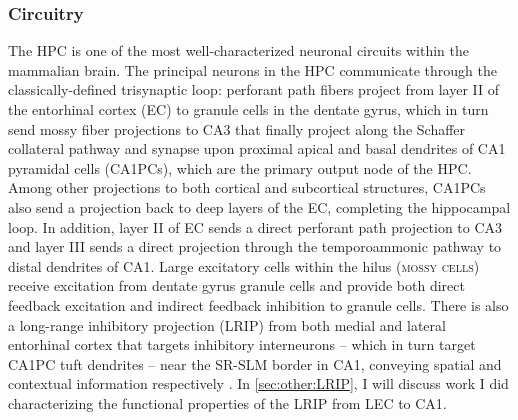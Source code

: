 \subsubsection{Circuitry}
The \ac{HPC} is one of the most well-characterized neuronal circuits within the mammalian brain.
The principal neurons in the \ac{HPC} communicate through the classically-defined trisynaptic loop: perforant path fibers project from layer II of the entorhinal cortex (EC) to granule cells in the dentate gyrus, which in turn send mossy fiber projections to CA3 that finally project along the Schaffer collateral pathway and synapse upon proximal apical and basal dendrites of CA1 pyramidal cells (CA1PCs), which are the primary output node of the \ac{HPC}.
Among other projections to both cortical and subcortical structures, CA1PCs also send a projection back to deep layers of the EC, completing the hippocampal loop.
In addition, layer II of EC sends a direct perforant path projection to CA3 and layer III sends a direct projection through the temporoammonic pathway to distal dendrites of CA1.
Large excitatory cells within the hilus (\textsc{mossy cells}) receive excitation from dentate gyrus granule cells and provide both direct feedback excitation and indirect feedback inhibition to granule cells.
There is also a long-range inhibitory projection (LRIP) from both medial and lateral entorhinal cortex that targets inhibitory interneurons -- which in turn target CA1PC tuft dendrites -- near the SR-SLM border in CA1, conveying spatial and contextual information respectively \citep{Basu2016}.
In \autoref{sec:other:LRIP}, I will discuss work I did characterizing the functional properties of the LRIP from LEC to CA1. 

